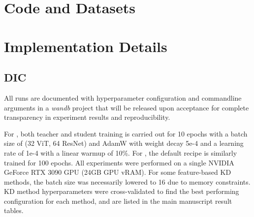 \clearpage
\setcounter{page}{1}
\maketitlesupplementary

\appendix


\renewcommand{\thesection}{\Alph{section}}
\renewcommand{\thesubsection}{\Alph{section}.\arabic{subsection}}

\section{Code and Datasets}\label{supp:code_and_datasets}



\section{Implementation Details}\label{supp:implementation_details}

\subsection{DIC}

All runs are documented with hyperparameter configuration and commandline arguments in a \textit{wandb} project that will be released upon acceptance for complete transparency in experiment results and reproducibility. %

For \rvl{}, both teacher and student training is carried out for 10 epochs with a batch size of (32 ViT, 64 ResNet) and AdamW with weight decay 5e-4 and a learning rate of 1e-4 with a linear warmup of 10\%.
For \tobacco{}, the default recipe is similarly trained for 100 epochs. All experiments were performed on a single NVIDIA GeForce RTX 3090 GPU (24GB GPU vRAM).
For some feature-based KD methods, the batch size was necessarily lowered to 16 due to memory constraints.
KD method hyperparameters were cross-validated to find the best performing configuration for each method, and are listed in the main manuscript result tables.

